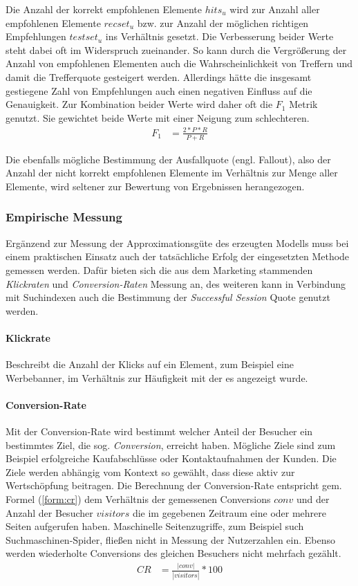 Die Anzahl der korrekt empfohlenen Elemente $hits_u$ wird zur Anzahl aller empfohlenen Elemente $recset_u$ bzw. zur Anzahl der möglichen richtigen Empfehlungen $testset_u$ ins Verhältnis gesetzt. Die Verbesserung beider Werte steht dabei oft im Widerspruch zueinander. So kann durch die Vergrößerung der Anzahl von empfohlenen Elementen auch die Wahrscheinlichkeit von Treffern und damit die Trefferquote gesteigert werden. Allerdings hätte die insgesamt gestiegene Zahl von Empfehlungen auch einen negativen Einfluss auf die Genauigkeit. Zur Kombination beider Werte wird daher oft die $F_1$ Metrik genutzt. Sie gewichtet beide Werte mit einer Neigung zum schlechteren.
\begin{align}
F_1 & = \frac{2 * P * R}{P+R} \label{form:f1}
\end{align}

Die ebenfalls mögliche Bestimmung der Ausfallquote (engl. Fallout), also der Anzahl der nicht korrekt empfohlenen Elemente im Verhältnis zur Menge aller Elemente, wird seltener zur Bewertung von Ergebnissen herangezogen. \citep{hb_08,rs}

\subsubsection{Empirische Messung}

Ergänzend zur Messung der Approximationsgüte des erzeugten Modells muss bei einem praktischen Einsatz auch der tatsächliche Erfolg der eingesetzten Methode gemessen werden. Dafür bieten sich die aus dem Marketing stammenden \textit{Klickraten} und \textit{Conversion-Raten} Messung an, des weiteren kann in Verbindung mit Suchindexen auch die Bestimmung der \textit{Successful Session} Quote genutzt werden.

\paragraph{Klickrate} Beschreibt die Anzahl der Klicks auf ein Element, zum Beispiel eine Werbebanner, im Verhältnis zur Häufigkeit mit der es angezeigt wurde. 

\paragraph{Conversion-Rate} Mit der Conversion-Rate wird bestimmt welcher Anteil der Besucher ein bestimmtes Ziel, die sog. \textit{Conversion}, erreicht haben. Mögliche Ziele sind zum Beispiel erfolgreiche Kaufabschlüsse oder Kontaktaufnahmen der Kunden. Die Ziele werden abhängig vom Kontext so gewählt, dass diese aktiv zur Wertschöpfung beitragen. Die Berechnung der Conversion-Rate entspricht gem. Formel (\ref{form:cr}) dem Verhältnis der gemessenen Conversions $conv$ und der Anzahl der Besucher $visitors$ die im gegebenen Zeitraum eine oder mehrere Seiten aufgerufen haben. Maschinelle Seitenzugriffe, zum Beispiel such Suchmaschinen-Spider, fließen nicht in Messung der Nutzerzahlen ein. Ebenso werden wiederholte Conversions des gleichen Besuchers nicht mehrfach gezählt. \citep{krueger2011conversion}
\begin{align}
CR & = \frac{|conv|}{|visitors| } * 100 \label{form:cr}
\end{align}

